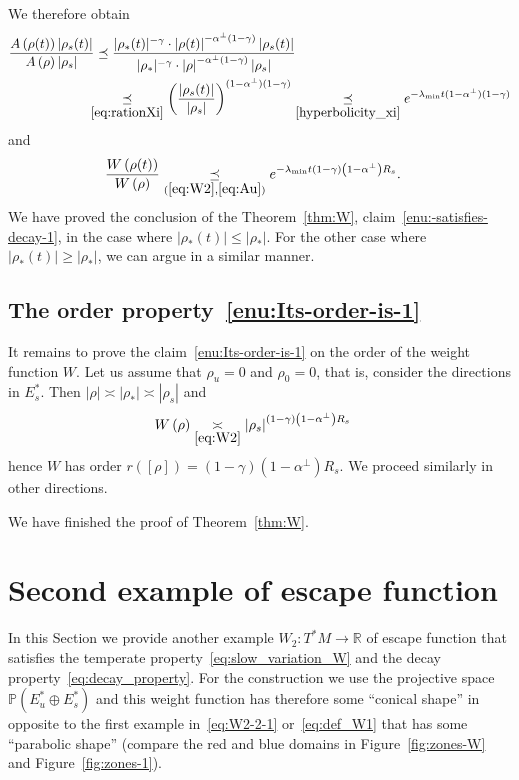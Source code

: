 \documentclass[AHL,Unicode,longabstracts,published]{cedram}
\newcommand{\bbR}{\mathbb{R}}
\newcommand{\bbP}{\mathbb{P}}
\newcommand{\bbR}{\mathbb{R}}
\begin{document}
We therefore obtain
\begin{align*}
\frac{A\left(\rho(t)\right)\left|\rho{}_{s}(t)\right|}{A\left(\rho\right)\left|\rho{}_{s}\right|}&\preceq\frac{|\rho_{*}(t)|^{-\gamma}\cdot\left|\rho(t)\right|^{-\alpha^{\perp}(1-\gamma)}\left|\rho{}_{s}(t)\right|}{|\rho_{*}|^{-\gamma}\cdot\left|\rho\right|^{-\alpha^{\perp}(1-\gamma)}\left|\rho{}_{s}\right|}\\
&\mkern-10mu\underset{\eqref{eq:rationXi}}{\preceq}\left(\frac{\left|\rho{}_{s}(t)\right|}{\left|\rho{}_{s}\right|}\right)^{(1-\alpha^{\perp})(1-\gamma)}\underset{\eqref{hyperbolicity_xi}}{\preceq}e^{-\lambda_{\min}t(1-\alpha^{\perp})(1-\gamma)}
\end{align*}
and
\begin{align*}
\frac{W\left(\rho(t)\right)}{W\left(\rho\right)} & \underset{(\ref{eq:W2},\ref{eq:Au})}{\preceq}e^{-\lambda_{\min}t\left(1-\gamma\right)\left(1-\alpha^{\perp}\right)R_{s}}.
\end{align*}
We have proved the conclusion of the Theorem~\ref{thm:W}, claim~\ref{enu:-satisfies-decay-1}, in the case where $|\rho_{*}(t)|\le|\rho_{*}|$. For the other case where $|\rho_{*}(t)|\ge|\rho_{*}|$, we can argue in a similar manner.

\subsection{The order property~\eqref{enu:Its-order-is-1}}

It remains to prove the claim~\eqref{enu:Its-order-is-1} on the order of the weight function $W$. Let us assume that $\rho_{u}=0$ and $\rho_{0}=0$, that is, consider the directions in $E_{s}^{*}$. Then $|\rho|\asymp|\rho_{*}|\asymp|\rho_{s}|$ and
\begin{align*}
W\left(\rho\right) & \underset{\eqref{eq:W2}}{\asymp}\left|\rho_{s}\right|^{\left(1-\gamma\right)\left(1-\alpha^{\perp}\right)R_{s}}
\end{align*}
hence $W$ has order $r([\rho])=(1-\gamma)(1-\alpha^{\perp})R_{s}$. We proceed similarly in other directions.

We have finished the proof of Theorem~\ref{thm:W}.

\section{\label{sec:Second-example-of}
Second example of escape function}

In this Section we provide another example $W_{2}:T^{*}M\to\bbR$ of escape function that satisfies the temperate property~\eqref{eq:slow_variation_W} and the decay property~\eqref{eq:decay_property}. For the construction we use the projective space $\bbP(E_{u}^{*}\oplus E_{s}^{*})$ and this weight function has therefore some ``conical shape'' in opposite to the first example in~\eqref{eq:W2-2-1} or~\eqref{eq:def_W1} that has some ``parabolic shape'' (compare the red and blue domains in Figure~\ref{fig:zones-W} and Figure~\ref{fig:zones-1}).
\end{document}
